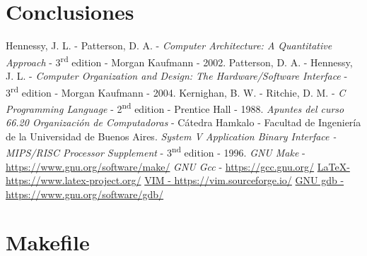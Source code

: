 \section{Conclusiones}

\clearpage
\begin{thebibliography}{10}
	 Hennessy, J. L. - Patterson, D. A. - \emph{Computer Architecture: A Quantitative Approach} - 3\textsuperscript{rd} edition - Morgan Kaufmann - 2002.
	 Patterson, D. A. - Hennessy, J. L. - \emph{Computer Organization and Design: The Hardware/Software Interface} - 3\textsuperscript{rd} edition - Morgan Kaufmann - 2004.
	 Kernighan, B. W. - Ritchie, D. M. - \emph{C Programming Language} - 2\textsuperscript{nd} edition - Prentice Hall - 1988.
	 \emph{Apuntes del curso 66.20 Organización de Computadoras} - Cátedra Hamkalo - Facultad de Ingeniería de la Universidad de Buenos Aires.
	 \emph{System V Application Binary Interface - MIPS/RISC Processor Supplement} - 3\textsuperscript{nd} edition - 1996.
	 \emph{GNU Make} - \hyperlink{make}{https://www.gnu.org/software/make/}
	 \emph{GNU Gcc} - \hyperlink{gcc}{https://gcc.gnu.org/}
	\href{https://www.latex-project.org/}{\LaTeX - https://www.latex-project.org/}
	\href{https://vim.sourceforge.io/}{VIM - https://vim.sourceforge.io/}
	\href{https://www.gnu.org/software/gdb/}{GNU gdb - https://www.gnu.org/software/gdb/}
\end{thebibliography}
\clearpage

\appendix




\section{Makefile}\label{appendix_makefile}

